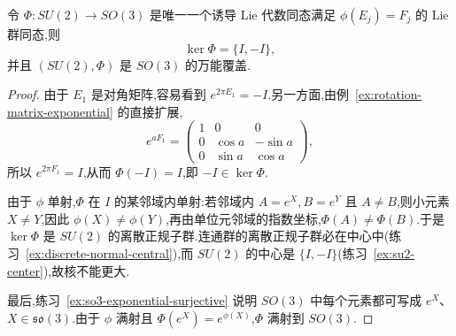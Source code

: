 {\begin{example}[$SU(2)$ 是 $SO(3)$ 的万能覆盖]\label{ex:su2-universal-cover-so3}
令 $\Phi:SU(2)\to SO(3)$ 是唯一一个诱导 Lie 代数同态满足 $\phi(E_j)=F_j$ 的 Lie 群同态,则
\[
\ker\Phi=\{I,-I\},
\]
并且 $(SU(2),\Phi)$ 是 $SO(3)$ 的万能覆盖.
\end{example}

\begin{proof}
由于 $E_1$ 是对角矩阵,容易看到 $e^{2\pi E_1}=-I$.另一方面,由例~\ref{ex:rotation-matrix-exponential} 的直接扩展,
\[
e^{aF_1}=\begin{pmatrix}1&0&0\\0&\cos a&-\sin a\\0&\sin a&\cos a\end{pmatrix},
\]
所以 $e^{2\pi F_1}=I$,从而 $\Phi(-I)=I$,即 $-I\in\ker\Phi$.

由于 $\phi$ 单射,$\Phi$ 在 $I$ 的某邻域内单射:若邻域内 $A=e^X,B=e^Y$ 且 $A\neq B$,则小元素 $X\neq Y$,因此 $\phi(X)\neq\phi(Y)$,再由单位元邻域的指数坐标,$\Phi(A)\neq\Phi(B)$.于是 $\ker\Phi$ 是 $SU(2)$ 的离散正规子群.连通群的离散正规子群必在中心中(练习~\ref{ex:discrete-normal-central}),而 $SU(2)$ 的中心是 $\{I,-I\}$(练习~\ref{ex:su2-center}),故核不能更大.

最后,练习~\ref{ex:so3-exponential-surjective} 说明 $SO(3)$ 中每个元素都可写成 $e^X$、$X\in\mathfrak{so}(3)$.由于 $\phi$ 满射且 $\Phi(e^X)=e^{\phi(X)}$,$\Phi$ 满射到 $SO(3)$.
\end{proof}

}

